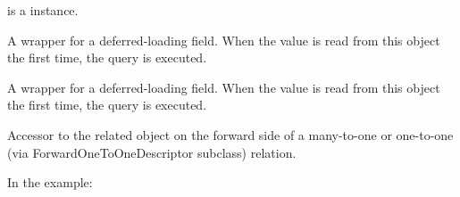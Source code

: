 \documentclass[letterpaper,10pt,english]{sphinxmanual}
\begin{document}
\begin{fulllineitems}
\begin{fulllineitems}
 is a  instance.

\end{fulllineitems}


\begin{fulllineitems}
\label{\detokenize{modules/models:gestion.models.HistoricalReload.PaymentMethod_id}}
A wrapper for a deferred-loading field. When the value is read from this
object the first time, the query is executed.

\end{fulllineitems}


\begin{fulllineitems}
\label{\detokenize{modules/models:gestion.models.HistoricalReload.amount}}
A wrapper for a deferred-loading field. When the value is read from this
object the first time, the query is executed.

\end{fulllineitems}


\begin{fulllineitems}
\label{\detokenize{modules/models:gestion.models.HistoricalReload.coopeman}}
Accessor to the related object on the forward side of a many-to-one or
one-to-one (via ForwardOneToOneDescriptor subclass) relation.

In the example:

\begin{sphinxVerbatim}[commandchars=\\\{\}]
 
       
\end{sphinxVerbatim}


\end{fulllineitems}
\end{fulllineitems}
\end{document}
